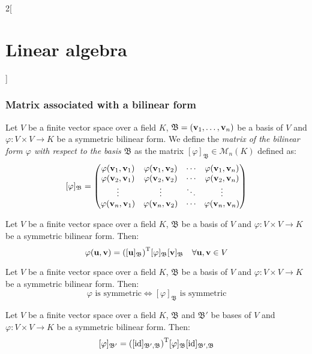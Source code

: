 \documentclass[../../../main.tex]{subfiles}
\begin{document}
\begin{multicols}{2}[\section{Linear algebra}]
  \subsubsection*{Matrix associated with a bilinear form}
  \begin{definition}
    Let $V$ be a finite vector space over a field $K$, $\mathfrak{B}=(\vb{v}_1,\ldots,\vb{v}_n)$ be a basis of $V$ and $\varphi:V\times V\rightarrow K$ be a symmetric bilinear form. We define the \textit{matrix of the bilinear form $\varphi$ with respect to the basis $\mathfrak{B}$} as the matrix $[\varphi]_\mathfrak{B}\in\mathcal{M}_n(K)$ defined as: $$[\varphi]_\mathfrak{B}=
      \begin{pmatrix}
        \varphi(\vb{v}_1,\vb{v}_1) & \varphi(\vb{v}_1,\vb{v}_2) & \cdots & \varphi(\vb{v}_1,\vb{v}_n) \\
        \varphi(\vb{v}_2,\vb{v}_1) & \varphi(\vb{v}_2,\vb{v}_2) & \cdots & \varphi(\vb{v}_2,\vb{v}_n) \\
        \vdots                                   & \vdots                                   & \ddots & \vdots                                   \\
        \varphi(\vb{v}_n,\vb{v}_1) & \varphi(\vb{v}_n,\vb{v}_2) & \cdots & \varphi(\vb{v}_n,\vb{v}_n) \\
      \end{pmatrix}$$
  \end{definition}
  \begin{lemma}
    Let $V$ be a finite vector space over a field $K$, $\mathfrak{B}$ be a basis of $V$ and $\varphi:V\times V\rightarrow K$ be a symmetric bilinear form. Then:
    $$\varphi(\vb{u},\vb{v})={\left([\vb{u}]_\mathfrak{B}\right)}^\mathrm{T}[\varphi]_\mathfrak{B}[\vb{v}]_\mathfrak{B}\quad\forall\vb{u},\vb{v}\in V$$
  \end{lemma}
  \begin{prop}
    Let $V$ be a finite vector space over a field $K$, $\mathfrak{B}$ be a basis of $V$ and $\varphi:V\times V\rightarrow K$ be a symmetric bilinear form. Then: $$\varphi\text{ is symmetric}\iff[\varphi]_\mathfrak{B}\text{ is symmetric}$$
  \end{prop}
  \begin{prop}
    Let $V$ be a finite vector space over a field $K$, $\mathfrak{B}$ and $\mathfrak{B}'$ be bases of $V$ and $\varphi:V\times V\rightarrow K$ be a symmetric bilinear form. Then: $$[\varphi]_{\mathfrak{B}'}={([\mathrm{id}]_{\mathfrak{B}',\mathfrak{B}})}^\mathrm{T}[\varphi]_\mathfrak{B}[\mathrm{id}]_{\mathfrak{B}',\mathfrak{B}}$$
  \end{prop}

\end{multicols}
\end{document}
